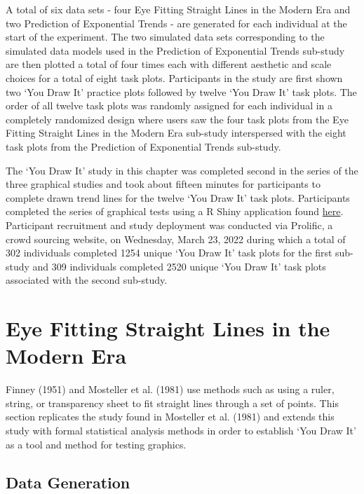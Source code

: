 \documentclass[print]{nuthesis}
\begin{document}
A total of six data sets - four Eye Fitting Straight Lines in the Modern Era and two Prediction of Exponential Trends - are generated for each individual at the start of the experiment.
The two simulated data sets corresponding to the simulated data models used in the Prediction of Exponential Trends sub-study are then plotted a total of four times each with different aesthetic and scale choices for a total of eight task plots.
Participants in the study are first shown two `You Draw It' practice plots followed by twelve `You Draw It' task plots.
The order of all twelve task plots was randomly assigned for each individual in a completely randomized design where users saw the four task plots from the Eye Fitting Straight Lines in the Modern Era sub-study interspersed with the eight task plots from the Prediction of Exponential Trends sub-study.

The `You Draw It' study in this chapter was completed second in the series of the three graphical studies and took about fifteen minutes for participants to complete drawn trend lines for the twelve `You Draw It' task plots.
Participants completed the series of graphical tests using a R Shiny application found \href{https://shiny.srvanderplas.com/perception-of-statistical-graphics/}{here}.
Participant recruitment and study deployment was conducted via Prolific, a crowd sourcing website, on Wednesday, March 23, 2022 during which a total of 302 individuals completed 1254 unique `You Draw It' task plots for the first sub-study and 309 individuals completed 2520 unique `You Draw It' task plots associated with the second sub-study.

\hypertarget{eye-fitting-straight-lines-in-the-modern-era}{%
\section{Eye Fitting Straight Lines in the Modern Era}\label{eye-fitting-straight-lines-in-the-modern-era}}

Finney (1951) and Mosteller et al. (1981) use methods such as using a ruler, string, or transparency sheet to fit straight lines through a set of points.
This section replicates the study found in Mosteller et al. (1981) and extends this study with formal statistical analysis methods in order to establish `You Draw It' as a tool and method for testing graphics.

\hypertarget{data-generation-1}{%
\subsection{Data Generation}\label{data-generation-1}}
\end{document}
